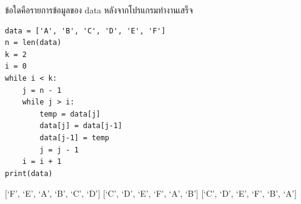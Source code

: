 \question ข้อใดคือรายการข้อมูลของ data หลังจากโปรแกรมทำงานเสร็จ 
\begin{verbatim}
data = ['A', 'B', 'C', 'D', 'E', 'F']
n = len(data)
k = 2
i = 0
while i < k:
    j = n - 1
    while j > i:
        temp = data[j]
        data[j] = data[j-1]
        data[j-1] = temp
        j = j - 1
    i = i + 1
print(data)
\end{verbatim}
\choicesgrid{[`E', `F', `A', `B', `C', `D']}
             {[`F', `E', `A', `B', `C', `D']}
             {[`C', `D', `E', `F', `A', `B']}
             {[`C', `D', `E', `F', `B', `A']}
